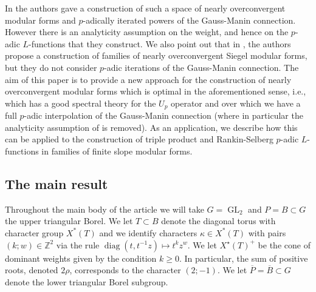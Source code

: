 \documentclass[10pt, oneside]{amsart}
\numberwithin{equation}{subsection}
\theoremstyle{definition}
\theoremstyle{remark}
\newcommand{\opn}[1]{\operatorname{#1}}
\def\Z{{\mathbb{Z}}}
\begin{document}
In \cite{AI_LLL} the authors gave a construction of such a space of nearly overconvergent modular forms and $p$-adically iterated powers of the Gauss-Manin connection. However there is an analyticity assumption on the weight, and hence on the $p$-adic $L$-functions that they construct. We also point out that in \cite{HarronXiao}, the authors propose a construction of families of nearly overconvergent Siegel modular forms, but they do not consider $p$-adic iterations of the Gauss-Manin connection. The aim of this paper is to provide a new approach for the construction of nearly overconvergent modular forms which is optimal in the aforementioned sense, i.e., which has a good spectral theory for the $U_p$ operator and over which we have a full $p$-adic interpolation of the Gauss-Manin connection (where in particular the analyticity assumption of \cite{AI_LLL} is removed). As an application, we describe how this can be applied to the construction of triple product and Rankin-Selberg $p$-adic $L$-functions in families of finite slope modular forms.


\subsection{The main result} \label{TheMainResultIntroSubSec}

Throughout the main body of the article we will take $G = \opn{GL}_2$ and $P=B \subset G$ the upper triangular Borel. We let $T \subset B$ denote the diagonal torus with character group $X^*(T)$ and we identify characters $\kappa \in X^*(T)$ with pairs $(k; w) \in \Z^2$ via the rule $\opn{diag}(t, t^{-1}z) \mapsto t^k z^w$. We let $X^\star(T)^+$ be the cone of dominant weights given by the condition $k \geq 0$. In particular, the sum of positive roots, denoted $2\rho$, corresponds to the character $(2; -1)$. We let $\overline{P} = \overline{B} \subset G$ denote the lower triangular Borel subgroup.
\end{document}
